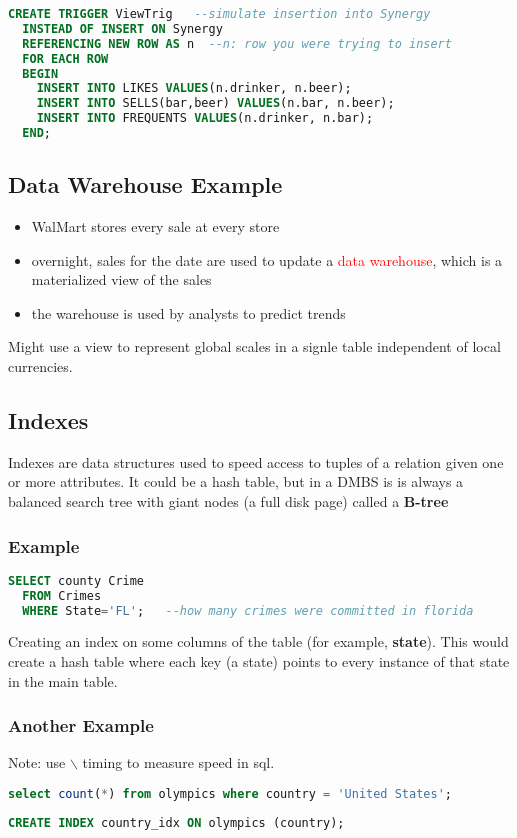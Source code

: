 \documentclass[12pt]{article}
\begin{document}
\begin{lstlisting}[language=sql, caption=view trigger]
  CREATE TRIGGER ViewTrig   --simulate insertion into Synergy
  INSTEAD OF INSERT ON Synergy
  REFERENCING NEW ROW AS n  --n: row you were trying to insert
  FOR EACH ROW
  BEGIN
    INSERT INTO LIKES VALUES(n.drinker, n.beer);
    INSERT INTO SELLS(bar,beer) VALUES(n.bar, n.beer);
    INSERT INTO FREQUENTS VALUES(n.drinker, n.bar);
  END;
\end{lstlisting}
\subsection{Data Warehouse Example}
\begin{itemize}
  \item WalMart stores every sale at every store
  \item overnight, sales for the date are used to update a
    \textcolor{red}{data warehouse}, which is a materialized view of the sales
  \item the warehouse is used by analysts to predict trends
\end{itemize}
Might use a view to represent global scales in a signle table independent of
local currencies.

\subsection{Indexes}
Indexes are data structures used to speed access to tuples of a relation given
one or more attributes.
It could be a hash table, but in a DMBS is is always a balanced search tree
with giant nodes (a full disk page) called a \textbf{B-tree}
\subsubsection{Example}
\begin{lstlisting}[language=sql, caption=a long computation]
  SELECT county Crime
  FROM Crimes
  WHERE State='FL';   --how many crimes were committed in florida
\end{lstlisting}
Creating an index on some columns of the table (for example, \textbf{state}).
This would create a hash table where each key (a state) points to every
instance of that state in the main table.

\subsubsection{Another Example}
Note: use $\backslash$ timing to measure speed in sql.
\begin{lstlisting}[language=sql, caption=a long computation]
  select count(*) from olympics where country = 'United States';
\end{lstlisting}
\begin{lstlisting}[language=sql, caption=create index to speed count]
  CREATE INDEX country_idx ON olympics (country);
\end{lstlisting}
\end{document}
